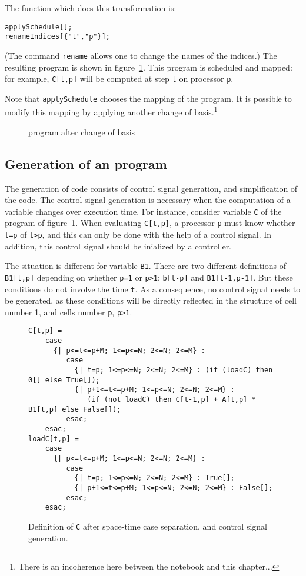 The function which does this transformation is:\\
\begin{verbatim}
applySchedule[];
renameIndices[{"t","p"}];
\end{verbatim}
(The command \texttt{rename} allows one to change the 
names of the indices.)
The resulting program is shown in 
figure~\ref{figder5}.  This program is scheduled and mapped: for
example, {\tt C[t,p]} will be computed at step {\tt t} on processor
{\tt p}.

Note that \texttt{applySchedule} chooses the 
mapping of the program. It is possible to modify this
mapping by applying another change of basis.\footnote{There is an 
incoherence here between the notebook and this chapter...}

\begin{figure}[htbp]

\caption{{\alfa} program after change of basis}
\label{figder5}
\end{figure}

\subsection{Generation of an {\alphaz} program}
\label{alphaZ}
The generation of {\alphaz} code consists of control
signal generation, and simplification of the code. 
The control signal
generation is necessary when the computation of a variable 
changes over execution time. For instance,
consider variable {\tt C} of the program of
figure~\ref{figder5}. 
When evaluating {\tt C[t,p]}, a processor {\tt p}
must know whether {\tt t=p} of {\tt t>p}, and this can only be done
with the help of a control signal. In addition, this control signal
should be inialized by a controller. 

The situation is different for variable \texttt{B1}.
There are two different definitions
of {\tt B1[t,p]}
depending on whether {\tt p=1} or {\tt p>1}: 
{\tt b[t-p]} and {\tt B1[t-1,p-1]}.
But these conditions
do not involve the time {\tt t}. As a consequence, 
no control signal needs to be generated, as these
conditions will be directly reflected in the structure of 
cell number 1, and cells number \texttt{p}, \texttt{p>1}.


\begin{figure}[htbp]
\begin{verbatim}
C[t,p] = 
    case
      {| p<=t<=p+M; 1<=p<=N; 2<=N; 2<=M} : 
         case
           {| t=p; 1<=p<=N; 2<=N; 2<=M} : (if (loadC) then 0[] else True[]);
           {| p+1<=t<=p+M; 1<=p<=N; 2<=N; 2<=M} : 
              (if (not loadC) then C[t-1,p] + A[t,p] * B1[t,p] else False[]);
         esac;
    esac;
loadC[t,p] = 
    case
      {| p<=t<=p+M; 1<=p<=N; 2<=N; 2<=M} : 
         case
           {| t=p; 1<=p<=N; 2<=N; 2<=M} : True[];
           {| p+1<=t<=p+M; 1<=p<=N; 2<=N; 2<=M} : False[];
         esac;
    esac;
\end{verbatim}
\caption{Definition of {\tt C} after space-time case separation, and 
control signal generation.}
\label{figder6}
\end{figure}

